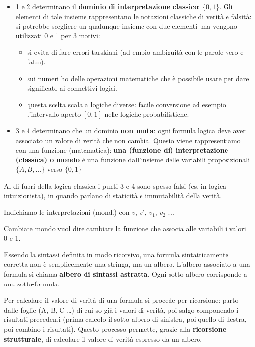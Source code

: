 \documentclass[
  a4paper,
]{article}
\providecommand{\tightlist}{%
  \setlength{\itemsep}{0pt}\setlength{\parskip}{0pt}}
\begin{document}
\begin{itemize}
\tightlist
\item
  1 e 2 determinano il \textbf{dominio di interpretazione classico}:
  \(\{0, 1\}\). Gli elementi di tale insieme rappresentano le notazioni
  classiche di verità e falsità: si potrebbe scegliere un qualunque
  insieme con due elementi, ma vengono utilizzati 0 e 1 per 3 motivi:

  \begin{itemize}
  \tightlist
  \item
    si evita di fare errori tarskiani (ad empio ambiguità con le parole
    vero e falso).
  \item
    sui numeri ho delle operazioni matematiche che è possibile usare per
    dare significato ai connettivi logici.
  \item
    questa scelta scala a logiche diverse: facile conversione ad esempio
    l'intervallo aperto \([0, 1]\) nelle logiche probabilistiche.
  \end{itemize}
\item
  3 e 4 determinano che un dominio \textbf{non muta}: ogni formula
  logica deve aver associato un valore di verità che non cambia. Questo
  viene rappresentiamo con una funzione (matematica): \textbf{una
  (funzione di) interpretazione (classica) o mondo} è una funzione
  dall'insieme delle variabili proposizionali \(\{A, B, . . .\}\) verso
  \(\{0, 1\}\)
\end{itemize}

Al di fuori della logica classica i punti 3 e 4 sono spesso falsi (es.
in logica intuizionista), in quando parlano di staticità e immutabilità
della verità.

Indichiamo le interpretazioni (mondi) con \(v\), \(v'\), \(v_1\),
\(v_2\) \ldots.

Cambiare mondo vuol dire cambiare la funzione che associa alle variabili
i valori 0 e 1.

Essendo la sintassi definita in modo ricorsivo, una formula
sintatticamente corretta non è semplicemente una stringa, ma un albero.
L'albero associato a una formula si chiama \textbf{albero di sintassi
astratta}. Ogni sotto-albero corrisponde a una sotto-formula.

Per calcolare il valore di verità di una formula si procede per
ricorsione: parto dalle foglie (A, B, C \ldots) di cui so già i valori
di verità, poi salgo componendo i risultati precedenti (prima calcolo il
sotto-albero di sinistra, poi quello di destra, poi combino i
risultati). Questo processo permette, grazie alla \textbf{ricorsione
strutturale}, di calcolare il valore di verità espresso da un albero.
\end{document}
